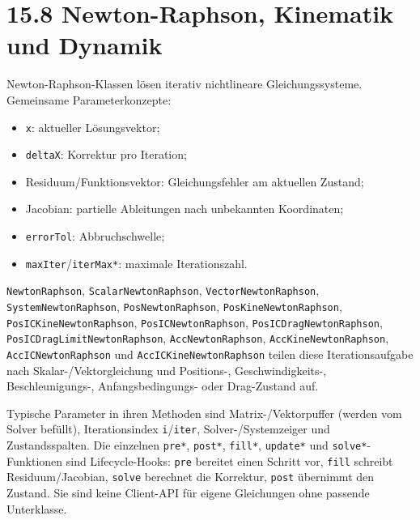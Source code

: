 \documentclass[
  12pt
]{book}
\providecommand{\tightlist}{%
  \setlength{\itemsep}{0pt}\setlength{\parskip}{0pt}}
\begin{document}
\hypertarget{newton-raphson-kinematik-und-dynamik}{%
\section{\texorpdfstring{{15.8} Newton-Raphson, Kinematik und
Dynamik}{15.8 Newton-Raphson, Kinematik und Dynamik}}\label{newton-raphson-kinematik-und-dynamik}}

Newton-Raphson-Klassen lösen iterativ nichtlineare Gleichungssysteme.
Gemeinsame Parameterkonzepte:

\begin{itemize}
\tightlist
\item
  \texttt{x}: aktueller Lösungsvektor;
\item
  \texttt{deltaX}: Korrektur pro Iteration;
\item
  Residuum/Funktionsvektor: Gleichungsfehler am aktuellen Zustand;
\item
  Jacobian: partielle Ableitungen nach unbekannten Koordinaten;
\item
  \texttt{errorTol}: Abbruchschwelle;
\item
  \texttt{maxIter}/\texttt{iterMax*}: maximale Iterationszahl.
\end{itemize}

\texttt{NewtonRaphson}, \texttt{ScalarNewtonRaphson},
\texttt{VectorNewtonRaphson}, \texttt{SystemNewtonRaphson},
\texttt{PosNewtonRaphson}, \texttt{PosKineNewtonRaphson},
\texttt{PosICKineNewtonRaphson}, \texttt{PosICNewtonRaphson},
\texttt{PosICDragNewtonRaphson}, \texttt{PosICDragLimitNewtonRaphson},
\texttt{AccNewtonRaphson}, \texttt{AccKineNewtonRaphson},
\texttt{AccICNewtonRaphson} und \texttt{AccICKineNewtonRaphson} teilen
diese Iterationsaufgabe nach Skalar-/Vektorgleichung und Positions-,
Geschwindigkeits-, Beschleunigungs-, Anfangsbedingungs- oder
Drag-Zustand auf.

Typische Parameter in ihren Methoden sind Matrix-/Vektorpuffer (werden
vom Solver befüllt), Iterationsindex \texttt{i}/\texttt{iter},
Solver-/Systemzeiger und Zustandsspalten. Die einzelnen \texttt{pre*},
\texttt{post*}, \texttt{fill*}, \texttt{update*} und
\texttt{solve*}-Funktionen sind Lifecycle-Hooks: \texttt{pre} bereitet
einen Schritt vor, \texttt{fill} schreibt Residuum/Jacobian,
\texttt{solve} berechnet die Korrektur, \texttt{post} übernimmt den
Zustand. Sie sind keine Client-API für eigene Gleichungen ohne passende
Unterklasse.
\end{document}
